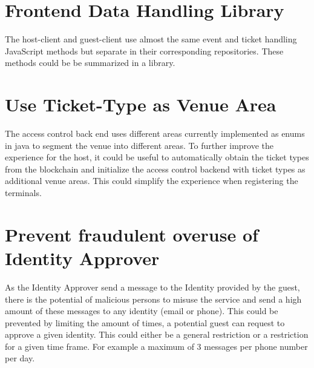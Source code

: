 \section{Frontend Data Handling Library}
The host-client and guest-client use almost the same event and ticket handling JavaScript methods but separate in their corresponding repositories. These methods could be be summarized in a library.

\section{Use Ticket-Type as Venue Area}
The access control back end uses different areas currently implemented as enums in java to segment the venue into different areas. To further improve the experience for the host, it could be useful to automatically obtain the ticket types from the blockchain and initialize the access control backend with ticket types as additional venue areas. This could simplify the experience when registering the terminals.

\section{Prevent fraudulent overuse of Identity Approver}
As the Identity Approver send a message to the Identity provided by the guest, there is the potential of malicious persons to misuse the service and send a high amount of these messages to any identity (email or phone). This could be prevented by limiting the amount of times, a potential guest can request to approve a given identity. This could either be a general restriction or a restriction for a given time frame. For example a maximum of 3 messages per phone number per day.